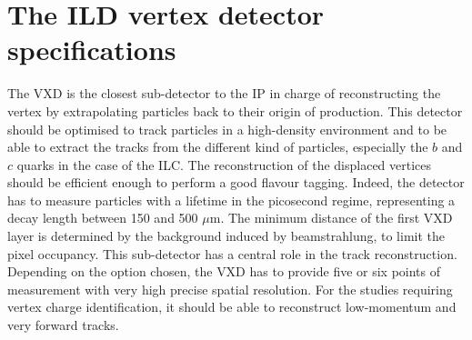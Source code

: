 







  \minitoc
  
  \section{The ILD vertex detector specifications}
   
    The \gls{VXD} is the closest sub-detector to the \acrfull{IP} in charge of reconstructing the vertex by extrapolating particles back to their origin of production. 
    This detector should be optimised to track particles in a high-density environment and to be able to extract the tracks from the different kind of particles, especially the $b$ and $c$ quarks in the case of the \gls{ILC}.
    The reconstruction of the displaced vertices should be efficient enough to perform a good flavour tagging.
    Indeed, the detector has to measure particles with a lifetime in the picosecond regime, representing a decay length between 150 and 500 $\mu\text{m}$.
    The minimum distance of the first \gls{VXD} layer is determined by the background induced by beamstrahlung, to limit the pixel occupancy.
    This sub-detector has a central role in the track reconstruction.
    Depending on the option chosen, the \gls{VXD} has to provide five or six points of measurement with very high precise spatial resolution.
    For the studies requiring vertex charge identification, it should be able to reconstruct low-momentum and very forward tracks.
   

